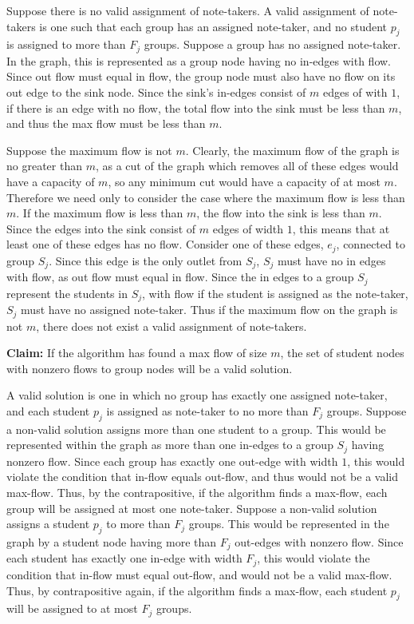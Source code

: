 \documentclass{article}
\begin{document}
Suppose there is no valid assignment of note-takers. A valid assignment of note-takers is one such that each group has an assigned note-taker, and no student $p_j$ is assigned to more than $F_j$ groups. Suppose a group has no assigned note-taker. In the graph, this is represented as a group node having no in-edges with flow. Since out flow must equal in flow, the group node must also have no flow on its out edge to the sink node. Since the sink's in-edges consist of $m$ edges of with $1$, if there is an edge with no flow, the total flow into the sink must be less than $m$, and thus the max flow must be less than $m$. 

Suppose the maximum flow is not $m$. Clearly, the maximum flow of the graph is no greater than $m$, as a cut of the graph which removes all of these edges would have a capacity of $m$, so any minimum cut would have a capacity of at most $m$. Therefore we need only to consider the case where the maximum flow is less than $m$. If the maximum flow is less than $m$, the flow into the sink is less than $m$. Since the edges into the sink consist of $m$ edges of width $1$, this means that at least one of these edges has no flow. Consider one of these edges, $e_j$, connected to group $S_j$. Since this edge is the only outlet from $S_j$, $S_j$ must have no in edges with flow, as out flow must equal in flow. Since the in edges to a group $S_j$ represent the students in $S_j$, with flow if the student is assigned as the note-taker, $S_j$ must have no assigned note-taker. Thus if the maximum flow on the graph is not $m$, there does not exist a valid assignment of note-takers.

\textbf{Claim: } If the algorithm has found a max flow of size $m$, the set of student nodes with nonzero flows to group nodes will be a valid solution. 

A valid solution is one in which no group has exactly one assigned note-taker, and each student $p_j$ is assigned as note-taker to no more than $F_j$ groups. Suppose a non-valid solution assigns more than one student to a group. This would be represented within the graph as more than one in-edges to a group $S_j$ having nonzero flow. Since each group has exactly one out-edge with width $1$, this would violate the condition that in-flow equals out-flow, and thus would not be a valid max-flow. Thus, by the contrapositive, if the algorithm finds a max-flow, each group will be assigned at most one note-taker. Suppose a non-valid solution assigns a student $p_j$ to more than $F_j$ groups. This would be represented in the graph by a student node having more than $F_j$ out-edges with nonzero flow. Since each student has exactly one in-edge with width $F_j$, this would violate the condition that in-flow must equal out-flow, and would not be a valid max-flow. Thus, by contrapositive again, if the algorithm finds a max-flow, each student $p_j$ will be assigned to at most $F_j$ groups.
\end{document}

